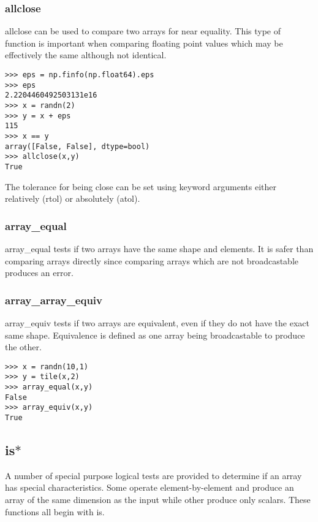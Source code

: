 \documentclass[KSmain.tex]{subfiles}
\begin{document}
\subsubsection{allclose}
allclose can be used to compare two arrays for near equality. This type of function is important when
comparing floating point values which may be effectively the same although not identical.
\begin{framed}
\begin{verbatim}
>>> eps = np.finfo(np.float64).eps
>>> eps
2.2204460492503131e16
>>> x = randn(2)
>>> y = x + eps
115
>>> x == y
array([False, False], dtype=bool)
>>> allclose(x,y)
True
\end{verbatim}
\end{framed}
The tolerance for being close can be set using keyword arguments either relatively (rtol) or absolutely
(atol).

\subsubsection{array\_equal}
array\_equal tests if two arrays have the same shape and elements. It is safer than comparing arrays directly
since comparing arrays which are not broadcastable produces an error.
\subsubsection{array\_array\_equiv}
array\_equiv tests if two arrays are equivalent, even if they do not have the exact same shape. Equivalence
is defined as one array being broadcastable to produce the other.
\begin{framed}
\begin{verbatim}>>> x = randn(10,1)
>>> y = tile(x,2)
>>> array_equal(x,y)
False
>>> array_equiv(x,y)
True
\end{verbatim}
\end{framed}
\newpage
\subsection{ is$\ast$}
A number of special purpose logical tests are provided to determine if an array has special characteristics.
Some operate element-by-element and produce an array of the same dimension as the input while other
produce only scalars. These functions all begin with is.
\end{document}

